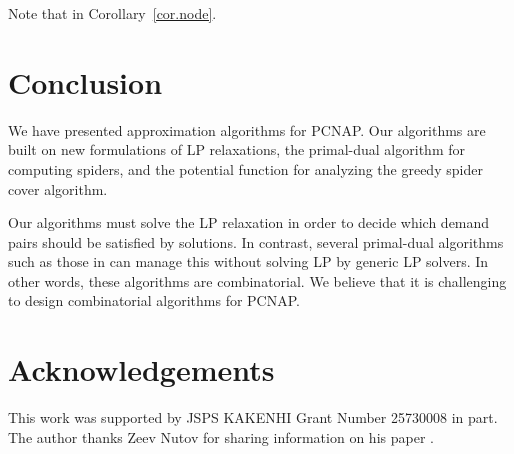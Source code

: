 \documentclass[11pt]{article}
\begin{document}
Note that  in Corollary~\ref{cor.node}.

\section{Conclusion}\label{sec.conclusion}

We have presented approximation algorithms for PCNAP.
Our algorithms are built on new formulations of LP relaxations, the primal-dual algorithm for computing spiders, and the potential
function for analyzing the greedy spider cover algorithm.

Our algorithms must solve the LP relaxation in order to decide which demand
pairs should be satisfied by solutions. In contrast, several primal-dual algorithms such as
those in \cite{BateniHL13,Konemann13CoRR} can manage this without solving LP
by generic LP solvers.
In other words, these algorithms are combinatorial.
We believe that it is challenging to design combinatorial algorithms for PCNAP.


\section*{Acknowledgements}

This work was supported by
JSPS KAKENHI Grant Number 25730008 in part.
The author thanks Zeev Nutov for sharing information on his paper \cite{Nutov12uncrossable}.
\end{document}
